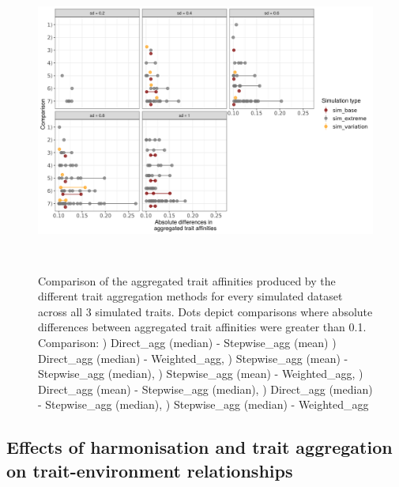 \documentclass{article}
\begin{document}
\begin{figure}[H]
  \centering
  \includegraphics[width=16.5cm, height=10cm]{Diffs_indiv_runs_sim.png}
  \caption{Comparison of the aggregated trait affinities produced by the different trait aggregation methods for every simulated dataset across all 3 simulated traits. Dots depict comparisons where absolute differences between aggregated trait affinities were greater than 0.1. \newline
  Comparison: ) Direct\_agg (median) - Stepwise\_agg (mean) ) Direct\_agg (median) - Weighted\_agg, ) Stepwise\_agg (mean) - Stepwise\_agg (median), ) Stepwise\_agg (mean) - Weighted\_agg, ) Direct\_agg (mean) - Stepwise\_agg (median), ) Direct\_agg (median) - Stepwise\_agg (median), ) Stepwise\_agg (median) - Weighted\_agg \newline
  }
  \label{fig:sim_indv_runs}
\end{figure}

\newpage




\subsection*{Effects of harmonisation and trait aggregation on trait-environment relationships}
\end{document}
